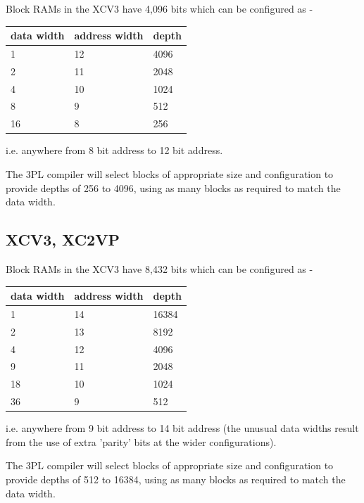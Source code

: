            Block RAMs in the XCV3 have 4,096 bits which
            can be configured as -
            
            \begin{tabular}{l l l}
            \hline
            data width & address width & depth \\
            \hline
            1  & 12 & 4096 \\
            2  & 11 & 2048 \\
            4  & 10 & 1024 \\
            8  & 9  & 512  \\
            16 & 8  & 256  \\
            \hline
            \end{tabular}

            i.e. anywhere from 8 bit address to 12 bit address.
            
            The 3PL compiler will select blocks of appropriate size
            and configuration to provide depths of 256 to 4096, using as
            many blocks as required to match the data width.
    
        \subsection{XCV3, XC2VP}
        
            Block RAMs in the XCV3 have 8,432 bits which
            can be configured as -
            
            \begin{tabular}{l l l}
            \hline
            data width & address width & depth \\
            \hline
            1  & 14 & 16384 \\
            2  & 13 & 8192  \\
            4  & 12 & 4096  \\
            9  & 11 & 2048  \\
            18 & 10 & 1024  \\
            36 & 9  & 512   \\
            \hline
            \end{tabular}

            i.e. anywhere from 9 bit address to 14 bit address
            (the unusual data widths result from the use of extra 'parity'
            bits at the wider configurations).
            
            The 3PL compiler will select blocks of appropriate size
            and configuration to provide depths of 512 to 16384, using as
            many blocks as required to match the data width.
    
